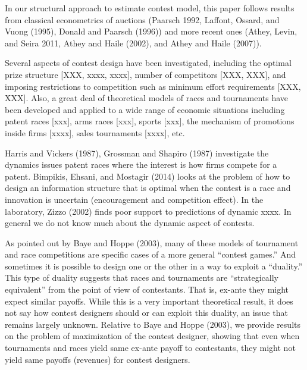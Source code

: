 \documentclass[10pt, titlepage]{article}
\begin{document}
In our structural approach to estimate contest model, this paper follows
results from classical econometrics of auctions (Paarsch 1992, Laffont,
Ossard, and Vuong (1995), Donald and Paarsch (1996)) and more recent
ones (Athey, Levin, and Seira 2011, Athey and Haile (2002), and Athey
and Haile (2007)).

Several aspects of contest design have been investigated, including the
optimal prize structure {[}XXX, xxxx, xxxx{]}, number of competitors
{[}XXX, XXX{]}, and imposing restrictions to competition such as minimum
effort requirements {[}XXX, XXX{]}. Also, a great deal of theoretical
models of races and tournaments have been developed and applied to a
wide range of economic situations including patent races {[}xxx{]}, arms
races {[}xxx{]}, sports {[}xxx{]}, the mechanism of promotions inside
firms {[}xxxx{]}, sales tournaments {[}xxxx{]}, etc.

Harris and Vickers (1987), Grossman and Shapiro (1987) investigate the
dynamics issues patent races where the interest is how firms compete for
a patent. Bimpikis, Ehsani, and Mostagir (2014) looks at the problem of
how to design an information structure that is optimal when the contest
is a race and innovation is uncertain (encouragement and competition
effect). In the laboratory, Zizzo (2002) finds poor support to
predictions of dynamic xxxx. In general we do not know much about the
dynamic aspect of contests.

As pointed out by Baye and Hoppe (2003), many of these models of
tournament and race competitions are specific cases of a more general
``contest games.'' And sometimes it is possible to design one or the
other in a way to exploit a ``duality.'' This type of duality suggests
that races and tournaments are ``strategically equivalent'' from the
point of view of contestants. That is, ex-ante they might expect similar
payoffs. While this is a very important theoretical result, it does not
say how contest designers should or can exploit this duality, an issue
that remains largely unknown. Relative to Baye and Hoppe (2003), we
provide results on the problem of maximization of the contest designer,
showing that even when tournaments and races yield same ex-ante payoff
to contestants, they might not yield same payoffs (revenues) for contest
designers.

\newcommand\reserve{\text{res}}
\newcommand\competition{c}
\newcommand\ability{a}
\newcommand\performance{y}
\newcommand\timing{t}
\newcommand\Timing{T}
\newcommand\Performance{Y}
\newcommand\marginal{\underline{a}}
\end{document}
